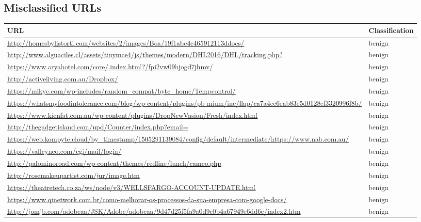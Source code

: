\documentclass[12pt,twoside]{report}
\begin{document}
\begin{spacing}{1}
\section{Misclassified URLs}\label{appendix:misclassifiedurls}
\begin{center}
\begin{longtable}{ |>{\raggedright\arraybackslash}p{}|>{\raggedright\arraybackslash}p{}| }
\captionsetup{width=14cm}
\hline
\textbf{URL} & \textbf{Classification}
\\
\hline
\endhead
\url{http://homesbylistorti.com/websites/2/images/Boa/19f1abc4c465912113ddocs/} & benign
\\
\hline
\url{http://www.alguaciles.cl/assets/tinymce4/js/themes/modern/DHL2016/DHL/tracking.php?} & benign
\\
\hline
\url{https://www.aryahotel.com/core/.index.html?/fpi2vw09hjogd7jhmv/} & benign
\\
\hline
\url{http://activeliving.com.au/Dropbox/} & benign
\\
\hline
\url{https://mikyc.com/wp-includes/random_compat/byte_home/Tempcontrol/} & benign
\\
\hline
\url{https://whatsmyfoodintolerance.com/blog/wp-content/plugins/pb-mium/inc/flap/ca7a4ee6eab83e5d0128ef3320996f8b/} & benign
\\
\hline
\url{https://www.kienfat.com.au/wp-content/plugins/DropNewVasion/Fresh/index.html} & benign
\\
\hline
\url{http://thegadgetisland.com/upd/Counter/index.php?email=} & benign
\\
\hline
\url{https://web.kompyte.cloud/by_timestamp/1505291139084/config/default/intermediate/https://www.nab.com.au/} & benign
\\
\hline
\url{https://valleynco.com/cgi/mail/login/} & benign
\\
\hline
\url{http://palominoroad.com/wp-content/themes/redline/lunch/cameo.php} & benign
\\
\hline
\url{http://rosemakeupartist.com/jur/image.htm} & benign
\\
\hline
\url{https://theatretech.co.za/ws/node/v3/WELLSFARGO-ACCOUNT-UPDATE.html} & benign
\\
\hline
\url{https://www.qinetwork.com.br/como-melhorar-os-processos-da-sua-empresa-com-google-docs/} & benign
\\
\hline
\url{http://jomjb.com/adobeaa/JSK/Adobe/adobeaa/9d47d25f5fa9a0d9c0b4a67949e6dd6c/index2.htm} & benign
\\
\hline

\end{longtable}
\end{center}
\end{spacing}
\end{document}
